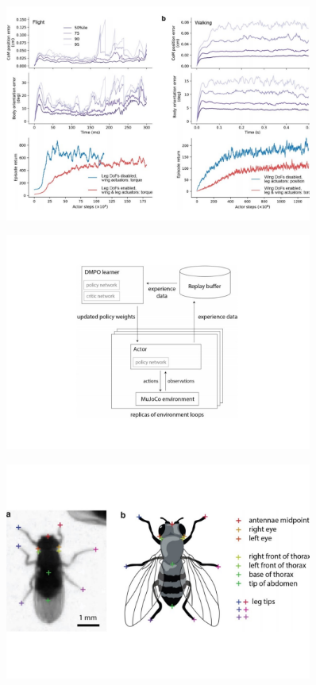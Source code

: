 \documentclass[sn-mathphys-num]{sn-jnl}%
\theoremstyle{thmstyleone}	%
\theoremstyle{thmstyletwo}	%
\theoremstyle{thmstylethree}	%
\begin{document}
\begin{figure}[!htb] 
	\centering
	\includegraphics[width=0.9\textwidth]{fig/extended_fig_6.pdf}
	\caption{}
	\label{fig:extended_fig_6}
\end{figure}


\begin{figure}[!htb] 
	\centering
	\includegraphics[width=0.9\textwidth]{fig/extended_fig_7.pdf}
	\caption{}
	\label{fig:extended_fig_7}
\end{figure}


\begin{figure}[!htb] 
	\centering
	\includegraphics[width=0.9\textwidth]{fig/extended_fig_8.pdf}
	\caption{}
	\label{fig:extended_fig_8}
\end{figure}
\end{document}

